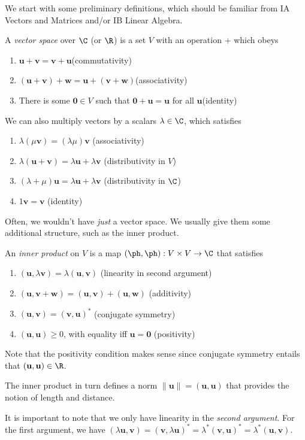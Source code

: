 \documentclass[a4paper]{article}
\begin{document}
We start with some preliminary definitions, which should be familiar from IA Vectors and Matrices and/or IB Linear Algebra.
\begin{defi}
  A \emph{vector space} over $\C$ (or $\R$) is a set $V$ with an operation $+$ which obeys
  \begin{enumerate}
    \item $\mathbf{u} + \mathbf{v} = \mathbf{v} + \mathbf{u}$\hfill (commutativity)
    \item $(\mathbf{u} + \mathbf{v}) + \mathbf{w} = \mathbf{u} + (\mathbf{v} + \mathbf{w})$\hfill (associativity)
    \item There is some $\mathbf{0}\in V$ such that $\mathbf{0} + \mathbf{u} = \mathbf{u}$ for all $\mathbf{u}$\hfill (identity)
  \end{enumerate}
  We can also multiply vectors by a scalars $\lambda\in \C$, which satisfies
  \begin{enumerate}
    \item $\lambda(\mu \mathbf{v}) = (\lambda \mu) \mathbf{v}$ \hfill (associativity)
    \item $\lambda(\mathbf{u} + \mathbf{v}) = \lambda \mathbf{u} + \lambda \mathbf{v}$ \hfill (distributivity in $V$)
    \item $(\lambda + \mu)\mathbf{u} = \lambda \mathbf{u} + \lambda \mathbf{v}$ \hfill (distributivity in $\C$)
    \item $1\mathbf{v} = \mathbf{v}$ \hfill (identity)
  \end{enumerate}
\end{defi}
Often, we wouldn't have \emph{just} a vector space. We usually give them some additional structure, such as the inner product.
\begin{defi}
  An \emph{inner product} on $V$ is a map $(\ph, \ph): V\times V \to \C$ that satisfies
  \begin{enumerate}
    \item $(\mathbf{u}, \lambda \mathbf{v}) = \lambda (\mathbf{u}, \mathbf{v})$ \hfill(linearity in second argument)
    \item $(\mathbf{u}, \mathbf{v} + \mathbf{w}) = (\mathbf{u}, \mathbf{v}) + (\mathbf{u}, \mathbf{w})$ \hfill (additivity)
    \item $(\mathbf{u}, \mathbf{v}) = (\mathbf{v}, \mathbf{u})^*$ \hfill (conjugate symmetry)
    \item $(\mathbf{u}, \mathbf{u}) \geq 0$, with equality iff $\mathbf{u} = \mathbf{0}$ \hfill (positivity)
  \end{enumerate}
  Note that the positivity condition makes sense since conjugate symmetry entails that $(\mathbf{u}, \mathbf{u}) \in \R$.

  The inner product in turn defines a norm $\|\mathbf{u}\| = (\mathbf{u}, \mathbf{u})$ that provides the notion of length and distance.
\end{defi}
It is important to note that we only have linearity in the \emph{second argument}. For the first argument, we have $(\lambda \mathbf{u}, \mathbf{v}) = (\mathbf{v}, \lambda \mathbf{u})^* = \lambda^* (\mathbf{v}, \mathbf{u})^* = \lambda^* (\mathbf{u}, \mathbf{v})$.
\end{document}
